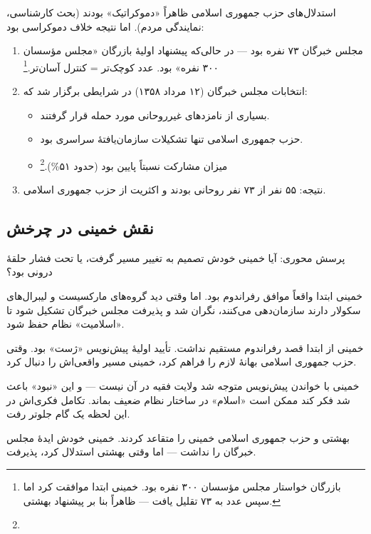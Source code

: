 \begin{warningBox}
استدلال‌های حزب جمهوری اسلامی ظاهراً «دموکراتیک» بودند (بحث کارشناسی، نمایندگی مردم). اما نتیجه خلاف دموکراسی بود:

\begin{enumerate}[label=\textcolor{cAccent}{\bfseries\arabic*.}, rightmargin=2em]
    \item مجلس خبرگان ۷۳ نفره بود — در حالی‌که پیشنهاد اولیهٔ بازرگان «مجلس مؤسسان ۳۰۰ نفره» بود. عدد کوچک‌تر = کنترل آسان‌تر.\footnote{بازرگان خواستار مجلس مؤسسان ۳۰۰ نفره بود. خمینی ابتدا موافقت کرد اما سپس عدد به ۷۳ تقلیل یافت — ظاهراً بنا بر پیشنهاد بهشتی. }
    \item انتخابات مجلس خبرگان (۱۲ مرداد ۱۳۵۸) در شرایطی برگزار شد که:
    \begin{itemize}
        \item بسیاری از نامزدهای غیرروحانی مورد حمله قرار گرفتند.
        \item حزب جمهوری اسلامی تنها تشکیلات سازمان‌یافتهٔ سراسری بود.
        \item میزان مشارکت نسبتاً پایین بود (حدود ۵۱\%).\footnote{}
    \end{itemize}
    \item نتیجه: ۵۵ نفر از ۷۳ نفر روحانی بودند و اکثریت از حزب جمهوری اسلامی.
\end{enumerate}
\end{warningBox}

\subsection{نقش خمینی در چرخش}

پرسش محوری: آیا خمینی خودش تصمیم به تغییر مسیر گرفت، یا تحت فشار حلقهٔ درونی بود؟

\begin{principleBox}
\begin{description}[style=nextline, font=\bfseries\color{cPrimary}]
    \item[تز ۱ (صداقت + اجبار)]
    خمینی ابتدا واقعاً موافق رفراندوم بود. اما وقتی دید گروه‌های مارکسیست و لیبرال‌های سکولار دارند سازمان‌دهی می‌کنند، نگران شد و پذیرفت مجلس خبرگان تشکیل شود تا «اسلامیت» نظام حفظ شود.

    \item[تز ۲ (خدعه)]
    خمینی از ابتدا قصد رفراندوم مستقیم نداشت. تأیید اولیهٔ پیش‌نویس «ژست» بود. وقتی حزب جمهوری اسلامی بهانهٔ لازم را فراهم کرد، خمینی مسیر واقعی‌اش را دنبال کرد.

    \item[تز ۳ (تکامل)]
    خمینی با خواندن پیش‌نویس متوجه شد ولایت فقیه در آن نیست — و این «نبود» باعث شد فکر کند ممکن است «اسلام» در ساختار نظام ضعیف بماند. تکامل فکری‌اش در این لحظه یک گام جلوتر رفت.

    \item[تز ۴ (فشار نخبگان)]
    بهشتی و حزب جمهوری اسلامی خمینی را متقاعد کردند. خمینی خودش ایدهٔ مجلس خبرگان را نداشت — اما وقتی بهشتی استدلال کرد، پذیرفت.
\end{description}
\end{principleBox}

